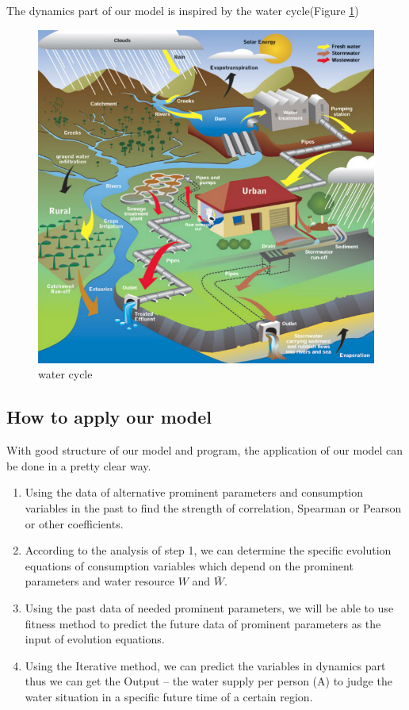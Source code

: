     The dynamics part of our model is inspired by the water cycle(Figure \ref{water cycle})\cite{WaterCycle}
    \begin{figure}[!h]
    \begin{center}
    \includegraphics[width = 12cm]{picture/UrbanWaterCycle.jpg}
    \caption{water cycle}
    \label{water cycle}
    \end{center}
    \end{figure}


  \subsection{How to apply our model}

    With good structure of our model and program, the application of our model can be done in a pretty clear way.

    \begin{enumerate}[step 1]
      \item Using the data of alternative prominent parameters and consumption variables in the past to find the strength of correlation, Spearman or Pearson or other coefficients.
      \item According to the analysis of step 1, we can  determine the specific evolution equations of consumption variables which depend on the prominent parameters and water resource $W$ and $\bar{W}$.
      \item Using the past data of needed prominent parameters, we will be able to use fitness method to predict the future data of prominent parameters as the input of evolution equations.
      \item Using the Iterative method, we can predict the variables in dynamics part thus we can get the Output -- the water supply per person (A) to judge the water situation in a specific future time of a certain region.
    \end{enumerate}

